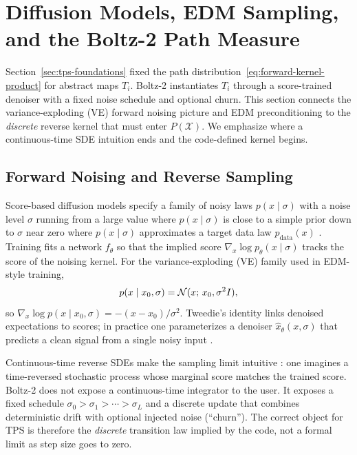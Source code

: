 \section{Diffusion Models, EDM Sampling, and the Boltz-2 Path Measure}
\label{sec:diffusion-boltz}

Section~\ref{sec:tps-foundations} fixed the path distribution~\eqref{eq:forward-kernel-product}
for abstract maps $T_i$. Boltz-2 instantiates $T_i$ through a score-trained denoiser
with a fixed noise schedule and optional churn. This section connects the
variance-exploding (VE) forward noising picture and EDM preconditioning
\citep{karras2022} to the \emph{discrete} reverse kernel that must enter $P(\mathcal{X})$.
We emphasize where a continuous-time SDE intuition ends and the code-defined
kernel begins.

\subsection{Forward Noising and Reverse Sampling}

Score-based diffusion models specify a family of noisy laws $p(x \mid \sigma)$ with a noise level $\sigma$ running from a large value where $p(x \mid \sigma)$ is close to a simple prior down to $\sigma$ near zero where $p(x \mid \sigma)$ approximates a target data law $p_{\mathrm{data}}(x)$ \citep{song2021}. Training fits a network $f_\theta$ so that the implied score $\nabla_x \log p_\theta(x \mid \sigma)$ tracks the score of the noising kernel. For the variance-exploding (VE) family used in EDM-style training,
\begin{equation}
  \label{eq:ve-forward}
  p(x \mid x_0, \sigma) = \mathcal{N}(x;\, x_0, \sigma^2 I),
\end{equation}
so $\nabla_x \log p(x \mid x_0, \sigma) = -(x-x_0)/\sigma^2$. Tweedie's identity links denoised expectations to scores; in practice one parameterizes a denoiser $\hat{x}_\theta(x,\sigma)$ that predicts a clean signal from a single noisy input \citep{karras2022}.

Continuous-time reverse SDEs make the sampling limit intuitive \citep{song2021}: one imagines a time-reversed stochastic process whose marginal score matches the trained score. Boltz-2 does not expose a continuous-time integrator to the user. It exposes a fixed schedule $\sigma_0 > \sigma_1 > \cdots > \sigma_L$ and a discrete update that combines deterministic drift with optional injected noise (``churn''). The correct object for TPS is therefore the \emph{discrete} transition law implied by the code, not a formal limit as step size goes to zero.

